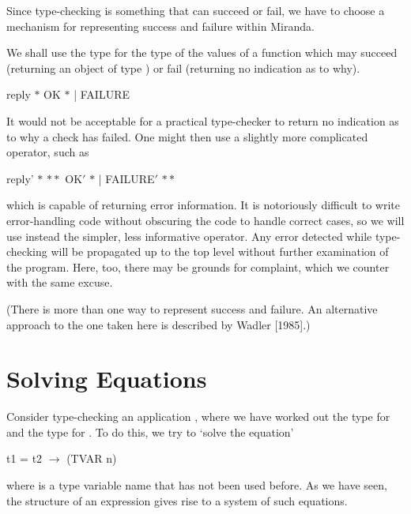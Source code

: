 Since type-checking is something that can succeed or fail, we have to choose a
mechanism for representing success and failure within Miranda.

We shall use the type  for the type of the values of a function which
may succeed (returning an object of type \ml{$\ast$}) or fail (returning no indication as
to why).
\begin{mlcoded}
    reply $\ast{}$ \typedecl{} OK $\ast{}$ | FAILURE
\end{mlcoded}
It would not be acceptable for a practical type-checker to return no indication
as to why a check has failed. One might then use a slightly more complicated
operator, such as
\begin{mlcoded}
    reply' $\ast{}$ $\ast\ast$ \typedecl{} OK$'$ $\ast$ | FAILURE$'$ $\ast\ast$
\end{mlcoded}
which is capable of returning error information. It is notoriously difficult to
write error-handling code without obscuring the code to handle correct cases,
so we will use instead the simpler, less informative operator. Any error
detected while type-checking will be propagated up to the top level without
further examination of the program. Here, too, there may be grounds for
complaint, which we counter with the same excuse.

(There is more than one way to represent success and failure. An
alternative approach to the one taken here is described by Wadler [1985].)

\section{Solving Equations}

Consider type-checking an application , where we have worked out
the type  for  and the type  for . To do this, we try to `solve the equation'
\begin{mlcoded}
    t1 = t2 $\rightarrow$ (TVAR n)
\end{mlcoded}
where  is a type variable name that has not been used before. As we have
seen, the structure of an expression gives rise to a system of such equations.

